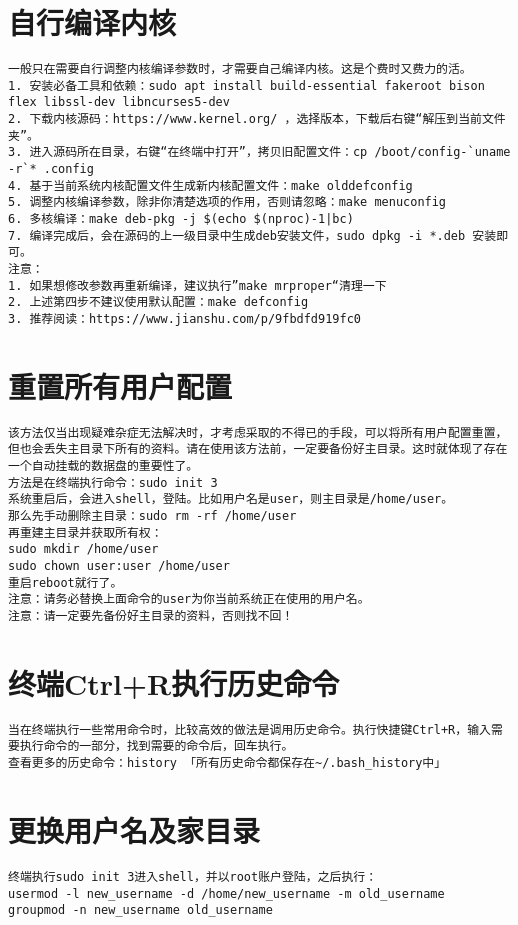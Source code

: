 \documentclass[a4paper,fontset=fandol,zihao=-4,linespread=1.2]{ctexbook}
\begin{document}
\section{自行编译内核}
\begin{lstlisting}
一般只在需要自行调整内核编译参数时，才需要自己编译内核。这是个费时又费力的活。
1. 安装必备工具和依赖：sudo apt install build-essential fakeroot bison flex libssl-dev libncurses5-dev
2. 下载内核源码：https://www.kernel.org/ ，选择版本，下载后右键“解压到当前文件夹”。
3. 进入源码所在目录，右键“在终端中打开”，拷贝旧配置文件：cp /boot/config-`uname -r`* .config
4. 基于当前系统内核配置文件生成新内核配置文件：make olddefconfig
5. 调整内核编译参数，除非你清楚选项的作用，否则请忽略：make menuconfig
6. 多核编译：make deb-pkg -j $(echo $(nproc)-1|bc)
7. 编译完成后，会在源码的上一级目录中生成deb安装文件，sudo dpkg -i *.deb 安装即可。
注意：
1. 如果想修改参数再重新编译，建议执行”make mrproper“清理一下
2. 上述第四步不建议使用默认配置：make defconfig
3. 推荐阅读：https://www.jianshu.com/p/9fbdfd919fc0
\end{lstlisting}

\section{重置所有用户配置}
\begin{lstlisting}
该方法仅当出现疑难杂症无法解决时，才考虑采取的不得已的手段，可以将所有用户配置重置，但也会丢失主目录下所有的资料。请在使用该方法前，一定要备份好主目录。这时就体现了存在一个自动挂载的数据盘的重要性了。
方法是在终端执行命令：sudo init 3
系统重启后，会进入shell，登陆。比如用户名是user，则主目录是/home/user。
那么先手动删除主目录：sudo rm -rf /home/user
再重建主目录并获取所有权：
sudo mkdir /home/user
sudo chown user:user /home/user
重启reboot就行了。
注意：请务必替换上面命令的user为你当前系统正在使用的用户名。
注意：请一定要先备份好主目录的资料，否则找不回！
\end{lstlisting}

\section{终端Ctrl+R执行历史命令}
\begin{lstlisting}
当在终端执行一些常用命令时，比较高效的做法是调用历史命令。执行快捷键Ctrl+R，输入需要执行命令的一部分，找到需要的命令后，回车执行。
查看更多的历史命令：history 「所有历史命令都保存在~/.bash_history中」
\end{lstlisting}

\section{更换用户名及家目录}
\begin{lstlisting}
终端执行sudo init 3进入shell，并以root账户登陆，之后执行：
usermod -l new_username -d /home/new_username -m old_username
groupmod -n new_username old_username
\end{lstlisting}
\end{document}
